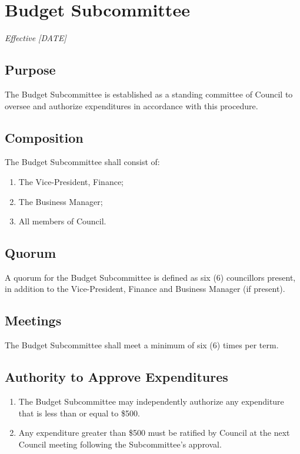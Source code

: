 \section{Budget Subcommittee}
\emph{Effective [DATE]}\\

\subsection{Purpose}
The Budget Subcommittee is established as a standing committee of Council to oversee and authorize expenditures in accordance with this procedure.

\subsection{Composition}
The Budget Subcommittee shall consist of:
\begin{enumerate}
    \item The Vice-President, Finance;
    \item The Business Manager;
    \item All members of Council.
\end{enumerate}

\subsection{Quorum}
A quorum for the Budget Subcommittee is defined as six (6) councillors present, in addition to the Vice-President, Finance and Business Manager (if present).

\subsection{Meetings}
The Budget Subcommittee shall meet a minimum of six (6) times per term.

\subsection{Authority to Approve Expenditures}
\begin{enumerate}
    \item The Budget Subcommittee may independently authorize any expenditure that is less than or equal to \$500.
    \item Any expenditure greater than \$500 must be ratified by Council at the next Council meeting following the Subcommittee's approval.
\end{enumerate}

